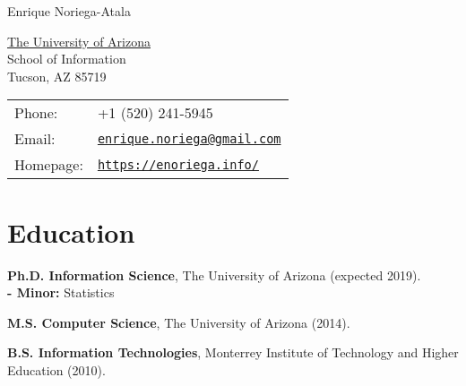 \documentclass[letterpaper]{article}
\def\name{Enrique Noriega-Atala}
\renewenvironment{itemize}{
  \begin{list}{}{
    \setlength{\leftmargin}{1.5em}
  }
}{
  \end{list}
}
\begin{document}
{\huge \name}


\vspace{0.25in}

\begin{minipage}{0.45\linewidth}
  \href{http://www.unc.edu/}{The University of Arizona} \\
  School of Information \\
  Tucson, AZ 85719
\end{minipage}
\begin{minipage}{0.45\linewidth}
  \begin{tabular}{ll}
    Phone: & +1 (520) 241-5945 \\
    Email: & \href{mailto:enrique.noriega@gmail.com}{\tt enrique.noriega@gmail.com} \\
    Homepage: & \href{https://enoriega.info/}{\tt https://enoriega.info/} \\
  \end{tabular}
\end{minipage}


%


\section*{Education}

\begin{itemize}
  \item \textbf{Ph.D. Information Science}, The University of Arizona (expected 2019). \\
     \textbf{- Minor:} Statistics
  \item \textbf{M.S. Computer Science}, The University of Arizona (2014).
  \item \textbf{B.S. Information Technologies}, Monterrey Institute of Technology and Higher Education (2010).
\end{itemize}
\end{document}
